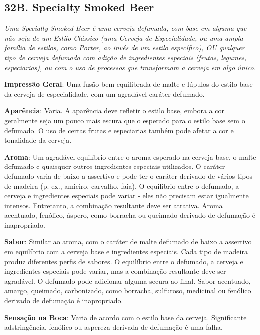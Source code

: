 \subsection*{32B. Specialty Smoked Beer}

\textit{Uma Specialty Smoked Beer é uma cerveja defumada, com base em alguma que não seja de um Estilo Clássico (uma Cerveja de Especialidade, ou uma ampla família de estilos, como Porter, ao invés de um estilo específico), OU qualquer tipo de cerveja defumada com adição de ingredientes especiais (frutas, legumes, especiarias), ou com o uso de processos que transformam a cerveja em algo único.}

\textbf{Impressão Geral}: Uma fusão bem equilibrada de malte e lúpulos do estilo base da cerveja de especialidade, com um agradável caráter defumado.

\textbf{Aparência}: Varia. A aparência deve refletir o estilo base, embora a cor geralmente seja um pouco mais escura que o esperado para o estilo base sem o defumado. O uso de certas frutas e especiarias também pode afetar a cor e tonalidade da cerveja.

\textbf{Aroma}: Um agradável equilíbrio entre o aroma esperado na cerveja base, o malte defumado e quaisquer outros ingredientes especiais utilizados. O caráter defumado varia de baixo a assertivo e pode ter o caráter derivado de vários tipos de madeira (p. ex., amieiro, carvalho, faia). O equilíbrio entre o defumado, a cerveja e ingredientes especiais pode variar - eles não precisam estar igualmente intensos. Entretanto, a combinação resultante deve ser atrativa. Aroma acentuado, fenólico, áspero, como borracha ou queimado derivado de defumação é inapropriado.

\textbf{Sabor}: Similar ao aroma, com o caráter de malte defumado de baixo a assertivo em equilíbrio com a cerveja base e ingredientes especiais. Cada tipo de madeira produz diferentes perfis de sabores. O equilíbrio entre o defumado, a cerveja e ingredientes especiais pode variar, mas a combinação resultante deve ser agradável. O defumado pode adicionar alguma secura ao final. Sabor acentuado, amargo, queimado, carbonizado, como borracha, sulfuroso, medicinal ou fenólico derivado de defumação é inapropriado.

\textbf{Sensação na Boca}: Varia de acordo com o estilo base da cerveja. Significante adstringência, fenólico ou aspereza derivada de defumação é uma falha.

